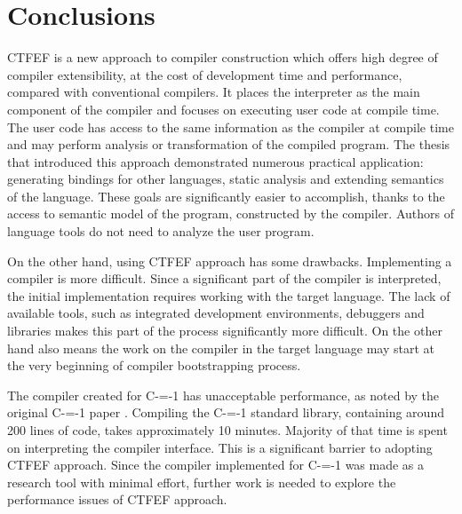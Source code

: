 \section{Conclusions}

CTFEF is a new approach to compiler construction which offers high degree of compiler extensibility, at the cost of development time and performance, compared with conventional compilers.
It places the interpreter as the main component of the compiler and focuses on executing user code at compile time.
The user code has access to the same information as the compiler at compile time and may perform analysis or transformation of the compiled program.
The thesis that introduced this approach \cite{grabski2020} demonstrated numerous practical application: generating bindings for other languages, static analysis and extending semantics of the language.
These goals are significantly easier to accomplish, thanks to the access to semantic model of the program, constructed by the compiler.
Authors of language tools do not need to analyze the user program.

On the other hand, using CTFEF approach has some drawbacks. Implementing a compiler is more difficult.
Since a significant part of the compiler is interpreted, the initial implementation requires working with the target language.
The lack of available tools, such as integrated development environments, debuggers and libraries makes this part of the process significantly more difficult.
On the other hand also means the work on the compiler in the target language may start at the very beginning of compiler bootstrapping process\cite{puntambekar:compiler_design, novillo2007gcc}.

The compiler created for C-=-1 has unacceptable performance, as noted by the original C-=-1 paper \cite{grabski2022compilation}.
Compiling the C-=-1 standard library, containing around 200 lines of code, takes approximately 10 minutes.
Majority of that time is spent on interpreting the compiler interface.
This is a significant barrier to adopting CTFEF approach.
Since the compiler implemented for C-=-1 was made as a research tool with minimal effort, further work is needed to explore the performance issues of CTFEF approach.
